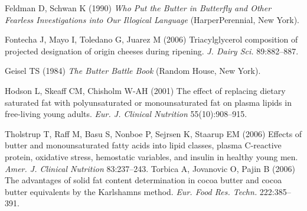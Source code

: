 \documentclass[opre,nonblindrev]{informs3}
\begin{document}
\begin{thebibliography}{}

Feldman D, Schwan K (1990) {\it Who Put the Butter in Butterfly
and Other Fearless Investigations into Our Illogical Language}
(HarperPerennial, New York).

Fontecha J, Mayo I, Toledano G, Juarez M (2006)
Triacylglycerol composition  of projected designation
of origin cheeses during ripening. {\it J. Dairy Sci.} 89:882--887.

Geisel TS (1984) {\it The Butter Battle Book\/} (Random House, New York).

Hodson L, Skeaff CM, Chisholm W-AH (2001) The effect of
replacing dietary saturated fat with polyunsaturated or
monounsaturated fat on plasma lipids in free-living young adults.
{\it Eur. J. Clinical Nutrition} 55(10):908--915.

Tholstrup T, Raff M, Basu S, Nonboe P, Sejrsen K, Staarup EM (2006) 
Effects of butter and mono\-un\-saturated fatty acids
into lipid classes, plasma C-reactive protein, oxidative stress,
hemostatic variables, and insulin in healthy young men. {\it Amer. J.
Clinical Nutrition} 83:237--243.
Torbica A, Jovanovic O, Pajin B (2006) The advantages of solid
fat content determination in cocoa butter and cocoa butter
equivalents by the Karlshamns method. {\it Eur. Food Res. Techn.} 222:385--391.

\end{thebibliography}

\end{document}
